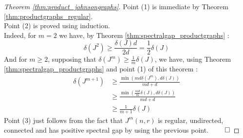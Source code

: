 \begin{proof}[Theorem \ref{thm:product_johnsongraphs}]
  Point (1) is immediate by Theorem \ref{thm:productgraphs_regular}.\\
  Point (2) is proved using induction.\\
  Indeed, for $m=2$ we have, by Theorem \ref{thm:spectralgap_productgraphs} :
    $$\delta(J^2) \geq \frac{\delta(J)d}{2d} = \frac{1}{2}\delta(J)$$
  And for $m\geq2$, supposing that $\delta(J^m) \geq \frac{1}{m}\delta(J)$, we have, using Theorem \ref{thm:spectralgap_productgraphs} and point (1) of this theorem :
    \begin{align*}
      \delta(J^{m+1}) &\geq \frac{\min\left(md\delta(J^m),d\delta(J)\right)}{md + d}\\
      &\geq \frac{\min\left(\frac{md}{m}\delta(J),d\delta(J)\right)}{md + d}\\
      &\geq \frac{1}{m+1}\delta(J)
    \end{align*}
Point (3) just follows from the fact that $J^m(n,r)$ is regular, undirected, connected and has positive spectral gap by using the previous point.
    $\qed$	
\end{proof}
